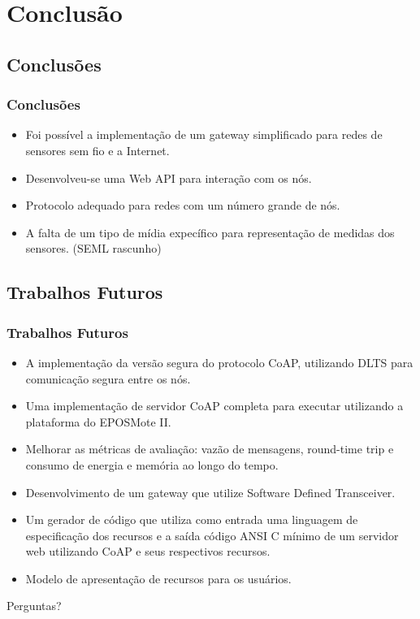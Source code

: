 \documentclass{beamer}
\begin{document}
\section{Conclusão}

\subsection{Conclusões}
\begin{frame}
\frametitle{Conclusões}
\begin{itemize}
    \item Foi possível a implementação de um gateway simplificado para redes de sensores sem fio e a Internet. 
    \item Desenvolveu-se uma Web API para interação com os nós. 
    \item Protocolo adequado para redes com um número grande de nós.
    \item A falta de um tipo de mídia expecífico para representação de medidas dos sensores. (SEML rascunho)
\end{itemize}
\end{frame}
\subsection{Trabalhos Futuros}
\begin{frame}
\frametitle{Trabalhos Futuros}

\begin{itemize}
    \item A implementa\c{c}\~ao da vers\~ao segura do protocolo CoAP, utilizando DLTS para comunica\c{c}\~ao segura entre os n\'os.
    \item Uma implementa\c{c}\~ao de servidor CoAP completa para executar utilizando a plataforma do EPOSMote II.
    \item Melhorar as métricas de avaliação: vazão de mensagens, round-time trip e consumo de energia e memória ao longo do tempo.

    \item Desenvolvimento de um gateway que utilize Software Defined Transceiver.

    \item Um gerador de c\'odigo que utiliza como entrada uma linguagem de especifica\c{c}\~ao dos recursos e a sa\'ida c\'odigo ANSI C m\'inimo de um servidor web utilizando CoAP e seus respectivos recursos.

    \item Modelo de apresentação de recursos para os usuários.
\end{itemize}
\end{frame}

\begin{frame}
\Huge{\centerline{Perguntas?}}
\end{frame}

\end{document}
